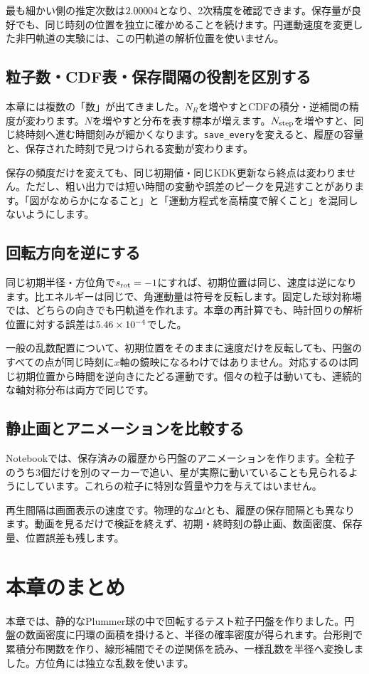 最も細かい側の推定次数は$2.00004$となり、2次精度を確認できます。保存量が良好でも、同じ時刻の位置を独立に確かめることを続けます。円運動速度を変更した非円軌道の実験には、この円軌道の解析位置を使いません。

\subsection{粒子数・CDF表・保存間隔の役割を区別する}
本章には複数の「数」が出てきました。$N_R$を増やすとCDFの積分・逆補間の精度が変わります。$N$を増やすと分布を表す標本が増えます。$N_{\rm step}$を増やすと、同じ終時刻へ進む時間刻みが細かくなります。\texttt{save\_every}を変えると、履歴の容量と、保存された時刻で見つけられる変動が変わります。

保存の頻度だけを変えても、同じ初期値・同じKDK更新なら終点は変わりません。ただし、粗い出力では短い時間の変動や誤差のピークを見逃すことがあります。「図がなめらかになること」と「運動方程式を高精度で解くこと」を混同しないようにします。

\subsection{回転方向を逆にする}
同じ初期半径・方位角で$s_{\rm rot}=-1$にすれば、初期位置は同じ、速度は逆になります。比エネルギーは同じで、角運動量は符号を反転します。固定した球対称場では、どちらの向きでも円軌道を作れます。本章の再計算でも、時計回りの解析位置に対する誤差は$5.46\times 10^{-4}$でした。

一般の乱数配置について、初期位置をそのままに速度だけを反転しても、円盤のすべての点が同じ時刻に$x$軸の鏡映になるわけではありません。対応するのは同じ初期位置から時間を逆向きにたどる運動です。個々の粒子は動いても、連続的な軸対称分布は両方で同じです。

\subsection{静止画とアニメーションを比較する}
Notebookでは、保存済みの履歴から円盤のアニメーションを作ります。全粒子のうち3個だけを別のマーカーで追い、星が実際に動いていることも見られるようにしています。これらの粒子に特別な質量や力を与えてはいません。

再生間隔は画面表示の速度です。物理的な$\Delta t$とも、履歴の保存間隔とも異なります。動画を見るだけで検証を終えず、初期・終時刻の静止画、数面密度、保存量、位置誤差も残します。

\section{本章のまとめ}
\label{sec:ch4-summary}
本章では、静的なPlummer球の中で回転するテスト粒子円盤を作りました。円盤の数面密度に円環の面積を掛けると、半径の確率密度が得られます。台形則で累積分布関数を作り、線形補間でその逆関係を読み、一様乱数を半径へ変換しました。方位角には独立な乱数を使います。

